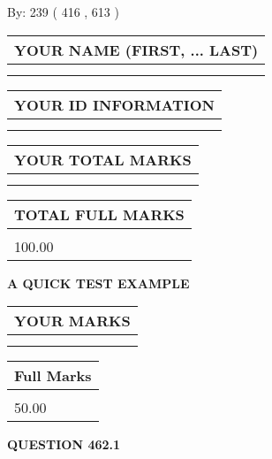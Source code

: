 \documentclass[12pt]{article}
\begin{document}
   
\hspace{1.0in} By: 
 239 ( 416 ,  613 )
   
   
   
   
\newpage 
\setcounter{page}{ 
   462001 } 
   
   
   
   
\noindent\begin{tabular}{|l|}
\hline
YOUR NAME (FIRST, ... LAST)  \\
\hline
 \\ 
 \\ 
\hline
\end{tabular}
\hspace{0.05in} \begin{tabular}{|l|}
\hline
 YOUR   ID   INFORMATION  \\
\hline
 \\ 
 \\ 
\hline
\end{tabular}
   
   
\vspace{0.2in}\noindent\begin{tabular}{|l|}
\hline
YOUR TOTAL MARKS  \\
\hline
 \\ 
 \\ 
\hline
\end{tabular}
\hspace{0.05in} \begin{tabular}{|l|}
\hline
TOTAL FULL MARKS  \\
\hline
 \\ 
100.00 \\
\hline
\end{tabular}
   
   
 \vspace{0.2in}
{\LARGE {\textbf{ A QUICK TEST EXAMPLE}}}
   
   
  
\vspace{0.2in}
  
\noindent\begin{tabular}{|l|}
\hline
 YOUR MARKS  \\
\hline
 \\ 
 \\ 
\hline
\end{tabular}
\hspace{0.05in} \begin{tabular}{|l|}
\hline
 Full Marks  \\
\hline
 \\ 
50.00 \\
\hline
\end{tabular}
{\textbf{\Large{QUESTION
462.1 
}}}
  
\end{document}
